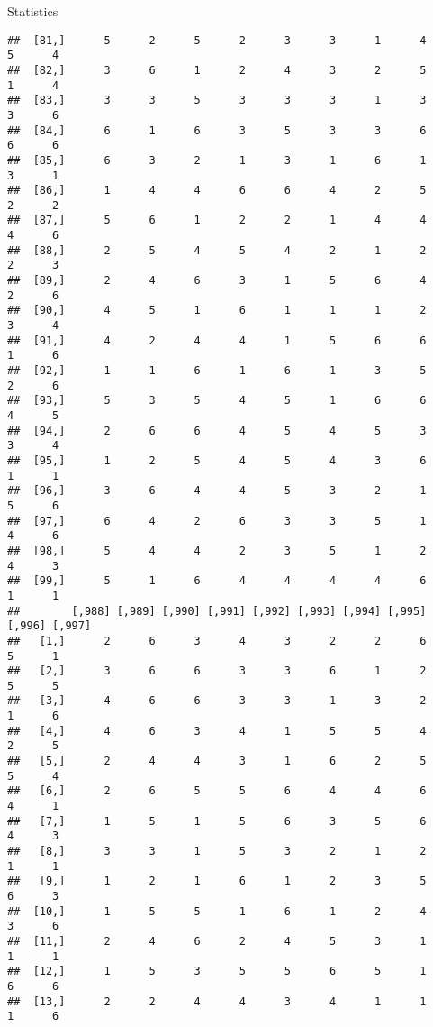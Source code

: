 \documentclass[
  ignorenonframetext,
]{beamer}
\begin{document}
\begin{frame}[fragile]{Statistics}
\begin{verbatim}
##  [81,]      5      2      5      2      3      3      1      4      5      4
##  [82,]      3      6      1      2      4      3      2      5      1      4
##  [83,]      3      3      5      3      3      3      1      3      3      6
##  [84,]      6      1      6      3      5      3      3      6      6      6
##  [85,]      6      3      2      1      3      1      6      1      3      1
##  [86,]      1      4      4      6      6      4      2      5      2      2
##  [87,]      5      6      1      2      2      1      4      4      4      6
##  [88,]      2      5      4      5      4      2      1      2      2      3
##  [89,]      2      4      6      3      1      5      6      4      2      6
##  [90,]      4      5      1      6      1      1      1      2      3      4
##  [91,]      4      2      4      4      1      5      6      6      1      6
##  [92,]      1      1      6      1      6      1      3      5      2      6
##  [93,]      5      3      5      4      5      1      6      6      4      5
##  [94,]      2      6      6      4      5      4      5      3      3      4
##  [95,]      1      2      5      4      5      4      3      6      1      1
##  [96,]      3      6      4      4      5      3      2      1      5      6
##  [97,]      6      4      2      6      3      3      5      1      4      6
##  [98,]      5      4      4      2      3      5      1      2      4      3
##  [99,]      5      1      6      4      4      4      4      6      1      1
##        [,988] [,989] [,990] [,991] [,992] [,993] [,994] [,995] [,996] [,997]
##   [1,]      2      6      3      4      3      2      2      6      5      1
##   [2,]      3      6      6      3      3      6      1      2      5      5
##   [3,]      4      6      6      3      3      1      3      2      1      6
##   [4,]      4      6      3      4      1      5      5      4      2      5
##   [5,]      2      4      4      3      1      6      2      5      5      4
##   [6,]      2      6      5      5      6      4      4      6      4      1
##   [7,]      1      5      1      5      6      3      5      6      4      3
##   [8,]      3      3      1      5      3      2      1      2      1      1
##   [9,]      1      2      1      6      1      2      3      5      6      3
##  [10,]      1      5      5      1      6      1      2      4      3      6
##  [11,]      2      4      6      2      4      5      3      1      1      1
##  [12,]      1      5      3      5      5      6      5      1      6      6
##  [13,]      2      2      4      4      3      4      1      1      1      6

\end{verbatim}
\end{frame}
\end{document}
